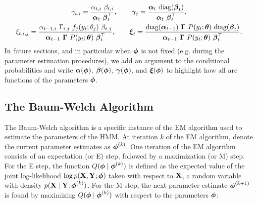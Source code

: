 \begin{gather}
    \gamma_{t,i} = \frac{\alpha_{t,i} ~ \beta_{t,i}}{\boldsymbol{\alpha}_{t} ~ \boldsymbol{\beta}_t^\top}, \qquad \boldsymbol{\gamma}_t = \frac{\boldsymbol{\alpha}_t ~ \text{diag}(\boldsymbol{\beta}_t)}{\boldsymbol{\alpha}_t ~ \boldsymbol{\beta}_t^\top} \label{eqn:gamma}, \\
    \xi_{t,i,j} = \frac{\alpha_{t-1,i} ~ \Gamma_{i,j} ~ f_{j}(y_{t};\theta_{j}) ~ \beta_{t,j}}{\boldsymbol{\alpha}_{t-1} ~ \boldsymbol{\Gamma} ~ P(y_{t};\boldsymbol{\theta}) ~ \boldsymbol{\beta}_{t}^\top}, \qquad \boldsymbol{\xi}_t = \frac{\text{diag}(\boldsymbol{\alpha}_{t-1}) ~ \boldsymbol{\Gamma} ~ P(y_t;\boldsymbol{\theta}) ~ \text{diag}(\boldsymbol{\beta}_t)}{\boldsymbol{\alpha}_{t-1} ~ \boldsymbol{\Gamma} ~ P(y_{t};\boldsymbol{\theta}) ~ \boldsymbol{\beta}_{t}^\top} \label{eqn:xi}.
\end{gather}
%
%
In future sections, and in particular when $\boldsymbol{\phi}$ is not fixed (e.g. during the parameter estimation procedures), we add an argument to the conditional probabilities and write $\boldsymbol{\alpha}(\boldsymbol{\phi})$, $\boldsymbol{\beta}(\boldsymbol{\phi})$, $\boldsymbol{\gamma}(\boldsymbol{\phi})$, and $\boldsymbol{\xi}(\boldsymbol{\phi})$ to highlight how all are functions of the parameters $\boldsymbol{\phi}$. 

\subsection{The Baum-Welch Algorithm}

The Baum-Welch algorithm is a specific instance of the EM algorithm used to estimate the parameters of the HMM. %
At iteration $k$ of the EM algorithm, denote the current parameter estimates as $\boldsymbol{\phi}^{(k)}$. One iteration of the EM algorithm consists of an expectation (or E) step, followed by a maximization (or M) step. For the E step, the function $Q(\boldsymbol{\phi} \mid \boldsymbol{\phi}^{(k)})$ is defined as the expected value of the joint log-likelihood $\log p(\mathbf{X},\mathbf{Y}; \boldsymbol{\phi})$ taken with respect to $\mathbf{X}$, a random variable with density $p(\mathbf{X} \mid \mathbf{Y} ; \boldsymbol{\phi}^{(k)})$. For the M step, the next parameter estimate $\boldsymbol{\phi}^{(k+1)}$ is found by maximizing $Q(\boldsymbol{\phi} \mid \boldsymbol{\phi}^{(k)})$ with respect to the parameters $\boldsymbol{\phi}$:


